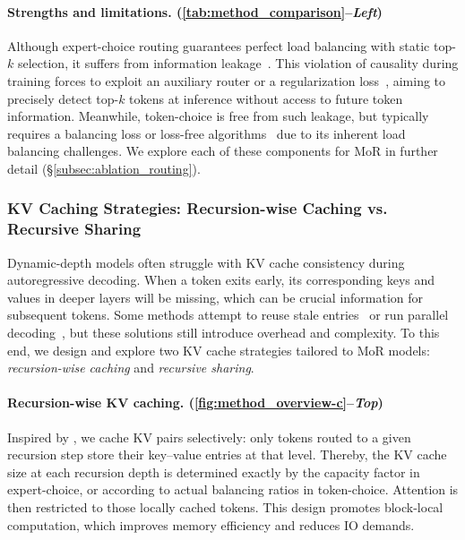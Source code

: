 \vspace{-12pt}
\paragraph{Strengths and limitations. (\autoref{tab:method_comparison}--\textit{Left})} 
Although expert-choice routing guarantees perfect load balancing with static top-$k$ selection, it suffers from information leakage~\citep{zhou2022mixture, wang2024auxiliary, raposo2024mixture}. This violation of causality during training forces to exploit an auxiliary router or a regularization loss~\citep{zhou2022mixture, raposo2024mixture}, aiming to precisely detect top-$k$ tokens at inference without access to future token information. Meanwhile, token-choice is free from such leakage, but typically requires a balancing loss or loss-free algorithms~\citep{wang2024auxiliary, fedus2022switch, zoph2022st} due to its inherent load balancing challenges. We explore each of these components for MoR in further detail (\S\ref{subsec:ablation_routing}).


\subsubsection{KV Caching Strategies: Recursion-wise Caching vs. Recursive Sharing}
\label{subsubsec:kv_cache}


Dynamic-depth models often struggle with KV cache consistency during autoregressive decoding. When a token exits early, its corresponding keys and values in deeper layers will be missing, which can be crucial information for subsequent tokens.
Some methods attempt to reuse stale entries~\citep{schuster2022confident} or run parallel decoding~\citep{bae-etal-2023-fast}, but these solutions still introduce overhead and complexity. To this end, we design and explore two KV cache strategies tailored to MoR models: \emph{recursion-wise caching} and \emph{recursive sharing}.



\vspace{-12pt}
\paragraph{Recursion-wise KV caching. (\autoref{fig:method_overview-c}--\textit{Top})}

Inspired by \citet{raposo2024mixture}, we cache KV pairs selectively: only tokens routed to a given recursion step store their key–value entries at that level. Thereby, the KV cache size at each recursion depth is determined exactly by the capacity factor in expert-choice,  or according to actual balancing ratios in token-choice. Attention is then restricted to those locally cached tokens. This design promotes block-local computation, which improves memory efficiency and reduces IO demands. 



